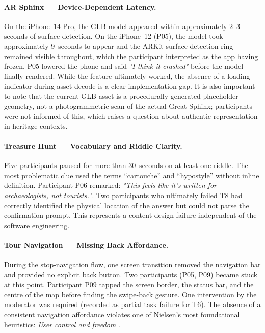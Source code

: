 \paragraph{AR Sphinx — Device-Dependent Latency.}
On the iPhone~14 Pro, the GLB model appeared within approximately 2--3 seconds of
surface detection. On the iPhone~12 (P05), the model took approximately 9~seconds to
appear and the ARKit surface-detection ring remained visible throughout, which the
participant interpreted as the app having frozen. P05 lowered the phone and said
\textit{"I think it crashed"} before the model finally rendered. While the feature
ultimately worked, the absence of a loading indicator during asset decode is a clear
implementation gap. It is also important to note that the current GLB asset is a
procedurally generated placeholder geometry, not a photogrammetric scan of the actual
Great Sphinx; participants were not informed of this, which raises a question about
authentic representation in heritage contexts.

\paragraph{Treasure Hunt — Vocabulary and Riddle Clarity.}
Five participants paused for more than 30~seconds on at least one riddle. The most
problematic clue used the terms ``cartouche'' and ``hypostyle'' without inline
definition. Participant P06 remarked: \textit{"This feels like it's written for
archaeologists, not tourists."}. Two participants who ultimately failed T8 had
correctly identified the physical location of the answer but could not parse the
confirmation prompt. This represents a content design failure independent of the
software engineering.

\paragraph{Tour Navigation — Missing Back Affordance.}
During the stop-navigation flow, one screen transition removed the navigation bar and
provided no explicit back button. Two participants (P05, P09) became stuck at this
point. Participant P09 tapped the screen border, the status bar, and the centre of the
map before finding the swipe-back gesture. One intervention by the moderator was
required (recorded as partial task failure for T6). The absence of a consistent
navigation affordance violates one of Nielsen's most foundational heuristics:
\textit{User control and freedom} \citep{nielsen1994}.

